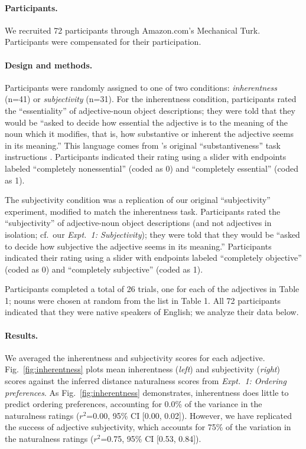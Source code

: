 \documentclass[12pt]{article}
\begin{document}
\paragraph{Participants.} We recruited 72 participants through Amazon.com's Mechanical Turk. Participants were compensated for their participation.

\paragraph{Design and methods.} Participants were randomly assigned to one of two conditions: \emph{inherentness} (n=41) or \emph{subjectivity} (n=31). For the inherentness condition, participants rated the ``essentiality'' of adjective-noun object descriptions; they were told that they would be ``asked to decide how essential the adjective is to the meaning of the noun which it modifies, that is, how substantive or inherent the adjective seems in its meaning.'' This language comes from \citeauthor{martin1969}'s original ``substantiveness'' task instructions \citep[Expt.~VII]{martin1969}. Participants indicated their rating using a slider with endpoints labeled ``completely nonessential'' (coded as 0) and ``completely essential'' (coded as 1).

The subjectivity condition was a replication of our original ``subjectivity'' experiment, modified to match the inherentness task. Participants rated the ``subjectivity'' of adjective-noun object descriptions (and not adjectives in isolation; cf.~our \emph{Expt.~1: Subjectivity}); they were told that they would be ``asked to decide how subjective the adjective seems in its meaning.'' Participants indicated their rating using a slider with endpoints labeled ``completely objective'' (coded as 0) and ``completely subjective'' (coded as 1).

Participants completed a total of 26 trials, one for each of the adjectives in Table 1; nouns were chosen at random from the list in Table 1. All 72 participants indicated that they were native speakers of English; we analyze their data below.

\paragraph{Results.} We averaged the inherentness and subjectivity scores for each adjective. Fig.~\ref{fig:inherentness} plots mean inherentness (\emph{left}) and subjectivity (\emph{right}) scores against the inferred distance naturalness scores from \textit{Expt.~1: Ordering preferences}. As Fig.~\ref{fig:inherentness} demonstrates, inherentness does little to predict ordering preferences, accounting for 0.0\% of the variance in the naturalness ratings ($r^2${=}0.00, 95\% CI [0.00,  0.02]). However, we have replicated the success of adjective subjectivity, which accounts for 75\% of the variation in the naturalness ratings ($r^2${=}0.75, 95\% CI [0.53,  0.84]).
\end{document}
